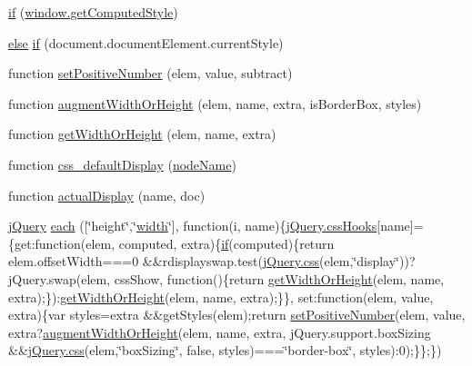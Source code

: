 \begin{DoxyCompactItemize}
\item 
\hyperlink{jquery-1_810_82_8js_add3620f254b483a46b557fde577ecbf7}{if} (\hyperlink{jquery-1_810_82_8min_8js_a03fc9e8486260425d041dd22b376c4a8}{window.\-get\-Computed\-Style})
\item 
\hyperlink{jquery-1_810_82_8js_a0544c3fe466e421738dae463968b70ba}{else} \hyperlink{jquery-1_810_82_8js_ac118b48e1947a1d7c85fefbdad49502e}{if} (document.\-document\-Element.\-current\-Style)
\item 
function \hyperlink{jquery-1_810_82_8js_a049182834e8b4b2d7485cd919ed272d7}{set\-Positive\-Number} (elem, value, subtract)
\item 
function \hyperlink{jquery-1_810_82_8js_aacaac1f0b5ea53030522e6f5b227ce51}{augment\-Width\-Or\-Height} (elem, name, extra, is\-Border\-Box, styles)
\item 
function \hyperlink{jquery-1_810_82_8js_a6520fbbeac78eeb0f519393470dc873b}{get\-Width\-Or\-Height} (elem, name, extra)
\item 
function \hyperlink{jquery-1_810_82_8js_a90f91be23732240774f2a323d500c78a}{css\-\_\-default\-Display} (\hyperlink{jquery-1_810_82-vsdoc_8js_a269e960a03eef49b8ed3a84932c1334d}{node\-Name})
\item 
function \hyperlink{jquery-1_810_82_8js_a88bc5a80e40ccc594ece17ae5772d5d3}{actual\-Display} (name, doc)
\item 
\hyperlink{jquery-1_810_82_8js_a5e01048fbd3a30b44e8d491d8945c457}{j\-Query} \hyperlink{jquery-1_810_82_8js_a7b098aabef28793353f2babd804e0b79}{each} (\mbox{[}\char`\"{}height\char`\"{},\char`\"{}\hyperlink{jquery-1_810_82-vsdoc_8js_ac02818d8d1572403600aa377a993fc3e}{width}\char`\"{}\mbox{]}, function(i, name)\{\hyperlink{jquery-1_810_82-vsdoc_8js_a9966a63bdc4e33753dbe36a83e7f96bf}{j\-Query.\-css\-Hooks}\mbox{[}name\mbox{]}=\{get\-:function(elem, computed, extra)\{\hyperlink{jquery-1_810_82_8js_aa2cebb51f03a2e3ab2af45a3f9241c96}{if}(computed)\{return elem.\-offset\-Width===0 \&\&rdisplayswap.\-test(\hyperlink{jquery-1_810_82-vsdoc_8js_aa8c6af259210b33d20642f8ee70cbfa4}{j\-Query.\-css}(elem,\char`\"{}display\char`\"{}))?j\-Query.\-swap(elem, css\-Show, function()\{return \hyperlink{jquery-1_810_82_8js_a6520fbbeac78eeb0f519393470dc873b}{get\-Width\-Or\-Height}(elem, name, extra);\})\-:\hyperlink{jquery-1_810_82_8js_a6520fbbeac78eeb0f519393470dc873b}{get\-Width\-Or\-Height}(elem, name, extra);\}\}, set\-:function(elem, value, extra)\{var styles=extra \&\&get\-Styles(elem);return \hyperlink{jquery-1_810_82_8js_a049182834e8b4b2d7485cd919ed272d7}{set\-Positive\-Number}(elem, value, extra?\hyperlink{jquery-1_810_82_8js_aacaac1f0b5ea53030522e6f5b227ce51}{augment\-Width\-Or\-Height}(elem, name, extra, j\-Query.\-support.\-box\-Sizing \&\&\hyperlink{jquery-1_810_82-vsdoc_8js_aa8c6af259210b33d20642f8ee70cbfa4}{j\-Query.\-css}(elem,\char`\"{}box\-Sizing\char`\"{}, false, styles)===\char`\"{}border-\/box\char`\"{}, styles)\-:0);\}\};\})

\end{DoxyCompactItemize}
